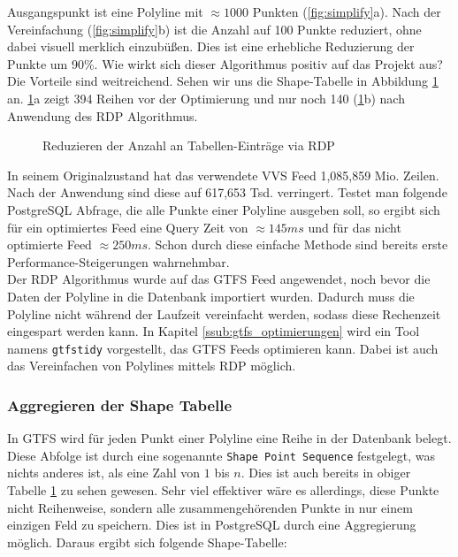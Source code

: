     Ausgangspunkt ist eine Polyline mit $\approx1000$ Punkten (\ref{fig:simplify}a). Nach der Vereinfachung (\ref{fig:simplify}b) ist die Anzahl auf 100 Punkte reduziert, ohne dabei visuell merklich einzubüßen. Dies ist eine erhebliche Reduzierung der Punkte um 90\%. Wie wirkt sich dieser Algorithmus positiv auf das Projekt aus? Die Vorteile sind weitreichend. Sehen wir uns die Shape-Tabelle in Abbildung \ref{fig:shape_simplify} an. \ref{fig:shape_simplify}a zeigt 394 Reihen vor der Optimierung und nur noch 140 (\ref{fig:shape_simplify}b) nach Anwendung des RDP Algorithmus.

    \begin{figure}[htbp]
      \centering
      \hfill
      \caption{Reduzieren der Anzahl an Tabellen-Einträge via RDP}
      \label{fig:shape_simplify}
    \end{figure}

    In seinem Originalzustand hat das verwendete VVS Feed 1,085,859 Mio. Zeilen. Nach der Anwendung sind diese auf 617,653 Tsd. verringert. Testet man folgende PostgreSQL Abfrage,
    \colorbox{materialGrey}{\texttt{}}
    die alle Punkte einer Polyline ausgeben soll, so ergibt sich für ein optimiertes Feed eine Query Zeit von $\approx145 ms$ und für das nicht optimierte Feed $\approx250 ms$. Schon durch diese einfache Methode sind bereits erste Performance-Steigerungen wahrnehmbar.\\

    Der RDP Algorithmus wurde auf das GTFS Feed angewendet, noch bevor die Daten der Polyline in die Datenbank importiert wurden. Dadurch muss die Polyline nicht während der Laufzeit vereinfacht werden, sodass diese Rechenzeit eingespart werden kann. In Kapitel \ref{ssub:gtfs_optimierungen} wird ein Tool namens \texttt{gtfstidy} vorgestellt, das GTFS Feeds optimieren kann. Dabei ist auch das Vereinfachen von Polylines mittels RDP möglich.


  \subsubsection{Aggregieren der Shape Tabelle}
  \label{ssub:aggregieren_der_shape_tabelle}
    In GTFS wird für jeden Punkt einer Polyline eine Reihe in der Datenbank belegt. Diese Abfolge ist durch eine sogenannte \texttt{Shape Point Sequence} festgelegt, was nichts anderes ist, als eine Zahl von $1$ bis $n$. Dies ist auch bereits in obiger Tabelle \ref{fig:shape_simplify} zu sehen gewesen. Sehr viel effektiver wäre es allerdings, diese Punkte nicht Reihenweise, sondern alle zusammengehörenden Punkte in nur einem einzigen Feld zu speichern. Dies ist in PostgreSQL durch eine Aggregierung möglich. Daraus ergibt sich folgende Shape-Tabelle:\\

